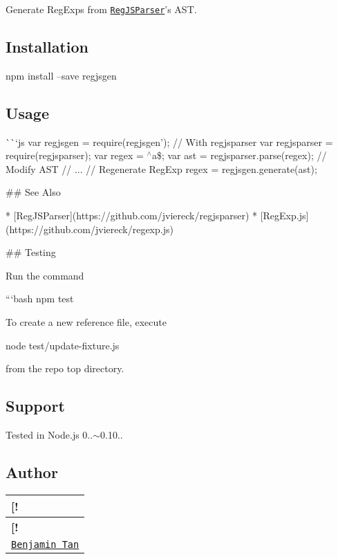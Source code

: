 Generate {\ttfamily Reg\+Exp}s from \href{https://github.com/jviereck/regjsparser}{\tt Reg\+J\+S\+Parser}’s A\+ST.

\subsection*{Installation}


\begin{DoxyCode}
npm install --save regjsgen
\end{DoxyCode}


\subsection*{Usage}

\`{}\`{}`js var regjsgen = require(\textquotesingle{}regjsgen'); // With {\ttfamily regjsparser} var regjsparser = require(\textquotesingle{}regjsparser\textquotesingle{}); var regex = \textquotesingle{}$^\wedge$a\$\textquotesingle{}; var ast = regjsparser.\+parse(regex); // Modify A\+ST // ... // Regenerate {\ttfamily Reg\+Exp} regex = regjsgen.\+generate(ast); 
\begin{DoxyCode}
## See Also

 * [RegJSParser](https://github.com/jviereck/regjsparser)
 * [RegExp.js](https://github.com/jviereck/regexp.js)

## Testing

Run the command

```bash
npm test
\end{DoxyCode}


To create a new reference file, execute


\begin{DoxyCode}
node test/update-fixture.js
\end{DoxyCode}


from the repo top directory.

\subsection*{Support}

Tested in Node.\+js 0..$\sim$0.10..

\subsection*{Author}

\tabulinesep=1mm
\begin{longtabu} spread 0pt [c]{*{1}{|X[-1]}|}
\hline
\rowcolor{\tableheadbgcolor}\textbf{ \mbox{[}!   }\\
\endfirsthead
\hline
\endfoot
\hline
\rowcolor{\tableheadbgcolor}\textbf{ \mbox{[}!   }\\
\endhead
\href{http://d10.github.io/}{\tt Benjamin Tan}   \\
\end{longtabu}


